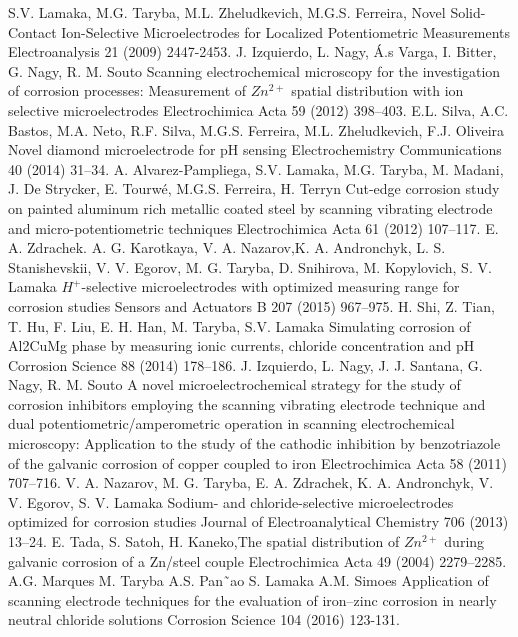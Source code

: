 \documentclass[3p]{elsarticle}
\begin{document}
\begin{thebibliography}{5}

S.V. Lamaka, M.G. Taryba, M.L. Zheludkevich, M.G.S. Ferreira, Novel Solid-Contact Ion-Selective Microelectrodes for Localized Potentiometric Measurements Electroanalysis 21 (2009) 2447-2453.
J. Izquierdo, L. Nagy, Á.s Varga, I. Bitter, G. Nagy, R. M. Souto Scanning electrochemical microscopy for the investigation of corrosion processes: Measurement of  $Zn^{2+}$ spatial distribution with ion selective microelectrodes Electrochimica Acta 59 (2012) 398–403. 
E.L. Silva, A.C. Bastos, M.A. Neto, R.F. Silva, M.G.S. Ferreira, M.L. Zheludkevich, F.J. Oliveira Novel diamond microelectrode for pH sensing Electrochemistry Communications 40 (2014) 31–34.
A. Alvarez-Pampliega, S.V. Lamaka, M.G. Taryba, M. Madani, J. De Strycker, E. Tourwé, M.G.S. Ferreira, H. Terryn Cut-edge corrosion study on painted aluminum rich metallic coated steel by scanning vibrating electrode and micro-potentiometric techniques Electrochimica Acta 61 (2012) 107–117.	
E. A. Zdrachek. A. G. Karotkaya, V. A. Nazarov,K. A. Andronchyk, L. S. Stanishevskii, V. V. Egorov, M. G. Taryba, D. Snihirova, M. Kopylovich, S. V. Lamaka $H^{+}$-selective microelectrodes with optimized measuring range for corrosion studies  Sensors and Actuators B 207 (2015) 967–975.
H. Shi, Z. Tian, T. Hu, F. Liu, E. H. Han, M. Taryba, S.V. Lamaka Simulating corrosion of Al2CuMg phase by measuring ionic currents, chloride concentration and pH Corrosion Science 88 (2014) 178–186.
J. Izquierdo, L. Nagy, J. J. Santana, G. Nagy, R. M. Souto A novel microelectrochemical strategy for the study of corrosion inhibitors employing the scanning vibrating electrode technique and dual potentiometric/amperometric operation in scanning electrochemical microscopy: Application to the study of the cathodic inhibition by benzotriazole of the galvanic corrosion of copper coupled to iron Electrochimica Acta 58 (2011) 707–716.
V. A. Nazarov, M. G. Taryba, E. A. Zdrachek, K. A. Andronchyk, V. V. Egorov, S. V. Lamaka Sodium- and chloride-selective microelectrodes optimized for corrosion studies Journal of Electroanalytical Chemistry 706 (2013) 13–24.
E. Tada, S. Satoh, H. Kaneko,The spatial distribution of $Zn^{2+}$ during galvanic corrosion of a Zn/steel couple Electrochimica Acta 49 (2004) 2279–2285.
A.G. Marques M. Taryba A.S. Pan˜ao S. Lamaka A.M. Simoes Application of scanning electrode techniques for the evaluation of iron–zinc corrosion in nearly neutral chloride solutions Corrosion Science 104 (2016) 123-131.

\end{thebibliography}
\end{document}
